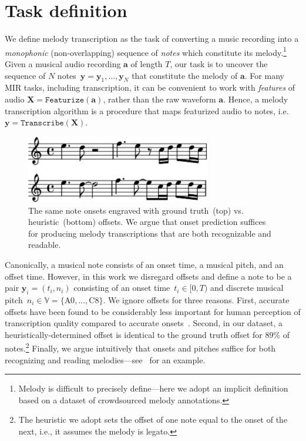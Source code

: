 \section{Task definition}
\label{sec:task}

We define melody transcription as the task of converting a music recording into a \emph{monophonic} (non-overlapping) sequence of \emph{notes} which constitute its melody.\footnote{Melody is difficult to precisely define---here we adopt an implicit definition based on a dataset of crowdsourced melody annotations.} Given a musical audio recording $\bm{a}$ of length $T$, our task is to 
uncover 
the sequence of $N$ notes~${\bm{y} = \bm{y}_1,\dots,\bm{y}_N}$  that constitute the melody of $\bm{a}$.  For many MIR tasks, including transcription, it can be convenient to work with \emph{features} of audio ${\bm{X} = \texttt{Featurize}(\bm{a})}$, rather than the raw waveform $\bm{a}$. 
Hence, a melody transcription algorithm is a procedure that maps featurized audio to notes, i.e.~${\bm{y} = \texttt{Transcribe}(\bm{X})}$. 

\begin{figure}
    \centering
    \includegraphics[width=8.1cm]{figs/heuristic_offsets.pdf}
    \caption{
The same note onsets engraved with ground truth~(top) vs. heuristic~(bottom) offsets. 
We argue that onset prediction suffices for producing melody transcriptions that are both recognizable and readable. 
}
 \label{fig:heuristic_offsets}
\end{figure}

Canonically, a musical note consists of an onset time, a musical pitch, and an offset time. 
However, in this work  
we disregard offsets and define a note to be a pair $\bm{y}_i = (t_i,n_i)$ consisting of an onset time~${t_i \in [0,T)}$ and discrete musical pitch~${n_i \in \mathbb{V} = \{\text{A0}, \ldots, \text{C8}\}}$.
We ignore offsets for three reasons. 
First, accurate offsets have been found to be considerably less important for human perception of transcription quality compared to accurate onsets~\cite{ycart2020investigating}. 
Second, in our dataset,
a heuristically-determined offset is identical to the ground truth offset for $89\%$ of notes.\footnote{The heuristic we adopt sets the offset of one note equal to the onset of the next, i.e., it assumes the melody is legato.}
Finally, we argue intuitively that onsets and pitches suffice for both recognizing and reading melodies---see~ for an example.

